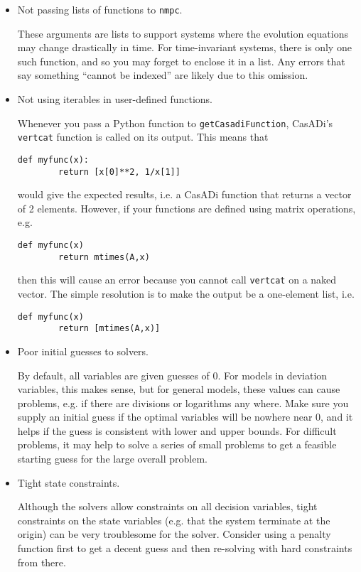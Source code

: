 \documentclass{article}
\newcommand{\casadi}{CasADi}
\begin{document}
\begin{itemize}
    \item Not passing lists of functions to \texttt{nmpc}.
    
    These arguments are lists to support systems where the evolution equations may change drastically in time.
    For time-invariant systems, there is only one such function, and so you may forget to enclose it in a list.
    Any errors that say something ``cannot be indexed'' are likely due to this omission.
    
    \item Not using iterables in user-defined functions.
    
    Whenever you pass a Python function to \texttt{getCasadiFunction}, \casadi{}'s \texttt{vertcat} function is called on its output.
    This means that
    \begin{lstlisting}[frame=L]
    def myfunc(x):
        return [x[0]**2, 1/x[1]]
    \end{lstlisting}
    would give the expected results, i.e. a \casadi{} function that returns a vector of 2 elements.
    However, if your functions are defined using matrix operations, e.g.
    \begin{lstlisting}[frame=L]
    def myfunc(x)
        return mtimes(A,x)
    \end{lstlisting}
    then this will cause an error because you cannot call \texttt{vertcat} on a naked vector.
    The simple resolution is to make the output be a one-element list, i.e.
    \begin{lstlisting}[frame=L]
    def myfunc(x)
        return [mtimes(A,x)]
    \end{lstlisting}
    
    \item Poor initial guesses to solvers.
    
    By default, all variables are given guesses of 0.
    For models in deviation variables, this makes sense, but for general models, these values can cause problems, e.g. if there are divisions or logarithms any where.
    Make sure you supply an initial guess if the optimal variables will be nowhere near 0, and it helps if the guess is consistent with lower and upper bounds.
    For difficult problems, it may help to solve a series of small problems to get a feasible starting guess for the large overall problem.
    
    \item Tight state constraints.
    
    Although the solvers allow constraints on all decision variables, tight constraints on the state variables (e.g. that the system terminate at the origin) can be very troublesome for the solver.
    Consider using a penalty function first to get a decent guess and then re-solving with hard constraints from there.
    
\end{itemize}
\end{document}
